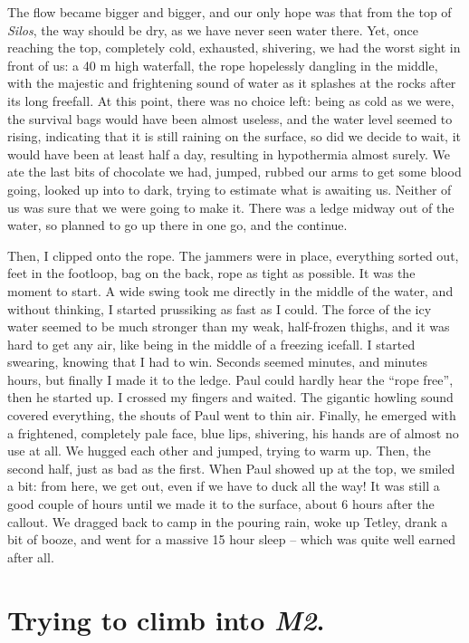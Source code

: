 The flow became bigger and bigger, and our only hope was that from the
top of \emph{Silos}, the way should be dry, as we have never seen water
there. Yet, once reaching the top, completely cold, exhausted,
shivering, we had the worst sight in front of us: a 40 m high waterfall,
the rope hopelessly dangling in the middle, with the majestic and
frightening sound of water as it splashes at the rocks after its long
freefall. At this point, there was no choice left: being as cold as we
were, the survival bags would have been almost useless, and the water
level seemed to rising, indicating that it is still raining on the
surface, so did we decide to wait, it would have been at least half a
day, resulting in hypothermia almost surely. We ate the last bits of
chocolate we had, jumped, rubbed our arms to get some blood going,
looked up into to dark, trying to estimate what is awaiting us. Neither
of us was sure that we were going to make it. There was a ledge midway
out of the water, so planned to go up there in one go, and the continue.

Then, I clipped onto the rope. The jammers were in place, everything
sorted out, feet in the footloop, bag on the back, rope as tight as
possible. It was the moment to start. A wide swing took me directly in
the middle of the water, and without thinking, I started prussiking as
fast as I could. The force of the icy water seemed to be much stronger
than my weak, half-frozen thighs, and it was hard to get any air, like
being in the middle of a freezing icefall. I started swearing, knowing
that I had to win. Seconds seemed minutes, and minutes hours, but
finally I made it to the ledge. Paul could hardly hear the ``rope
free'', then he started up. I crossed my fingers and waited. The
gigantic howling sound covered everything, the shouts of Paul went to
thin air. Finally, he emerged with a frightened, completely pale face,
blue lips, shivering, his hands are of almost no use at all. We hugged
each other and jumped, trying to warm up. Then, the second half, just as
bad as the first. When Paul showed up at the top, we smiled a bit: from
here, we get out, even if we have to duck all the way! It was still a
good couple of hours until we made it to the surface, about 6 hours
after the callout. We dragged back to camp in the pouring rain, woke up
Tetley, drank a bit of booze, and went for a massive 15 hour sleep --
which was quite well earned after all.


\hypertarget{trying-to-climb-into-m2.}{%
\section{\texorpdfstring{Trying to climb into
\emph{M2}.}{Trying to climb into M2.}}\label{trying-to-climb-into-m2.}}


